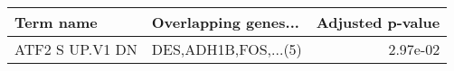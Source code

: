 \begin{tabular}{llr}
\toprule
      Term name & Overlapping genes... &  Adjusted p-value \\
\midrule
ATF2 S UP.V1 DN & DES,ADH1B,FOS,...(5) &          2.97e-02 \\
\bottomrule
\end{tabular}
